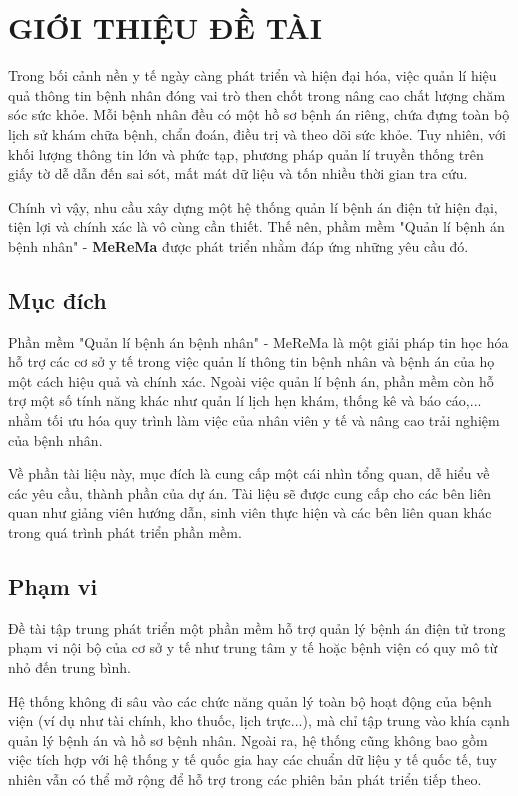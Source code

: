 \chapter{GIỚI THIỆU ĐỀ TÀI}

Trong bối cảnh nền y tế ngày càng phát triển và hiện đại hóa, việc quản lí hiệu quả thông tin bệnh nhân đóng vai trò then chốt trong nâng cao chất lượng chăm sóc sức khỏe. Mỗi bệnh nhân đều có một hồ sơ bệnh án riêng, chứa đựng toàn bộ lịch sử khám chữa bệnh, chẩn đoán, điều trị và theo dõi sức khỏe. Tuy nhiên, với khối lượng thông tin lớn và phức tạp, phương pháp quản lí truyền thống trên giấy tờ dễ dẫn đến sai sót, mất mát dữ liệu và tốn nhiều thời gian tra cứu.

Chính vì vậy, nhu cầu xây dựng một hệ thống quản lí bệnh án điện tử hiện đại, tiện lợi và chính xác là vô cùng cần thiết. Thế nên, phầm mềm "Quản lí bệnh án bệnh nhân" - \textbf{MeReMa} được phát triển nhằm đáp ứng những yêu cầu đó.

\section{Mục đích}

Phần mềm "Quản lí bệnh án bệnh nhân" - MeReMa là một giải pháp tin học hóa hỗ trợ các cơ sở y tế trong việc quản lí thông tin bệnh nhân và bệnh án của họ một cách hiệu quả và chính xác. Ngoài việc quản lí bệnh án, phần mềm còn hỗ trợ một số tính năng khác như quản lí lịch hẹn khám, thống kê và báo cáo,... nhằm tối ưu hóa quy trình làm việc của nhân viên y tế và nâng cao trải nghiệm của bệnh nhân.

Về phần tài liệu này, mục đích là cung cấp một cái nhìn tổng quan, dễ hiểu về các yêu cầu, thành phần của dự án. Tài liệu sẽ được cung cấp cho các bên liên quan như giảng viên hướng dẫn, sinh viên thực hiện và các bên liên quan khác trong quá trình phát triển phần mềm.

\section{Phạm vi}

Đề tài tập trung phát triển một phần mềm hỗ trợ quản lý bệnh án điện tử trong phạm vi nội bộ của cơ sở y tế như trung tâm y tế hoặc bệnh viện có quy mô từ nhỏ đến trung bình.

Hệ thống không đi sâu vào các chức năng quản lý toàn bộ hoạt động của bệnh viện (ví dụ như tài chính, kho thuốc, lịch trực...), mà chỉ tập trung vào khía cạnh quản lý bệnh án và hồ sơ bệnh nhân. Ngoài ra, hệ thống cũng không bao gồm việc tích hợp với hệ thống y tế quốc gia hay các chuẩn dữ liệu y tế quốc tế, tuy nhiên vẫn có thể mở rộng để hỗ trợ trong các phiên bản phát triển tiếp theo.

